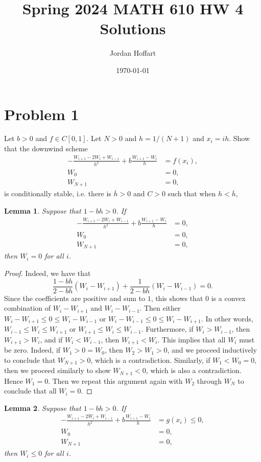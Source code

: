 \documentclass{article}
\title{Spring 2024 MATH 610 HW 4 Solutions}
\author{Jordan Hoffart}
\date{\today}
\theoremstyle{plain}
\newtheorem{lemma}{Lemma}
\begin{document}
\maketitle
\section*{Problem 1}
Let $b > 0$ and $f \in C[0,1]$. Let $N > 0$ and $h = 1/(N+1)$ and $x_i = ih$.
Show that the downwind scheme
\begin{align*}
	-\frac{W_{i+1}-2W_i+W_{i-1}}{h^2} + b\frac{W_{i+1}-W_i}{h} & = f(x_i), \\
	W_0                                                        & = 0,      \\
	W_{N+1}                                                    & = 0,
\end{align*}
is conditionally stable, i.e. there is $\overline h > 0$ and $C > 0$ such that when $h < \overline h$,
\begin{lemma}\label{lemma1}
	Suppose that $1-bh > 0$.
	If
	\begin{align*}
		-\frac{W_{i+1}-2W_i+W_{i-1}}{h^2} + b\frac{W_{i+1}-W_i}{h} & = 0, \\
		W_0                                                        & = 0, \\
		W_{N+1}                                                    & = 0,
	\end{align*}
	then $W_i = 0$ for all $i$.
\end{lemma}
\begin{proof}
	Indeed, we have that
	\[\frac{1-bh}{2-bh}(W_i-W_{i+1}) + \frac{1}{2-bh}(W_i-W_{i-1})=0.\]
	Since the coefficients are positive and sum to $1$, this shows that $0$ is a convex combination of $W_i-W_{i+1}$ and $W_i-W_{i-1}$.
	Then either $W_i-W_{i+1} \leq 0 \leq W_i - W_{i-1}$ or $W_i-W_{i-1} \leq 0 \leq W_i - W_{i+1}$.
	In other words, $W_{i-1} \leq W_i \leq W_{i+1}$ or $W_{i+1} \leq W_i \leq W_{i-1}$.
	Furthermore, if $W_i > W_{i-1}$, then $W_{i+1} > W_i$, and if $W_i < W_{i-1}$, then $W_{i+1} < W_i$.
	This implies that all $W_i$ must be zero.
	Indeed, if $W_1 > 0 = W_0$, then $W_2 > W_1 > 0$, and we proceed inductively to conclude that $W_{N+1} > 0$, which is a contradiction.
	Similarly, if $W_1 < W_0 = 0$, then we proceed similarly to show $W_{N+1} < 0$, which is also a contradiction.
	Hence $W_1 = 0$.
	Then we repeat this argument again with $W_2$ through $W_N$ to conclude that all $W_i = 0$.
\end{proof}
\begin{lemma}\label{lemma2}
	Suppose that $1-bh > 0$.
	If
	\begin{align*}
		-\frac{W_{i+1}-2W_i+W_{i-1}}{h^2} + b\frac{W_{i+1}-W_i}{h} & = g(x_i) \leq 0, \\
		W_0                                                        & = 0,             \\
		W_{N+1}                                                    & = 0,
	\end{align*}
	then $W_i \leq 0$ for all $i$.
\end{lemma}
\end{document}
